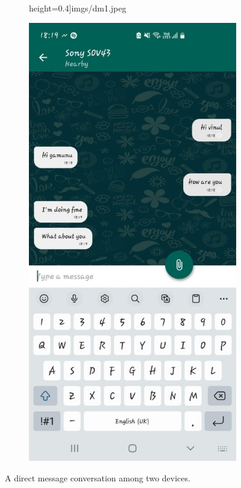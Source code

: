 \begin{figure}
\begin{subfigure}[b]{0.3\textwidth}
            height=0.4\textheight]{imgs/dm1.jpeg}
        \label{dm:1}
    \end{subfigure}
    \hspace{1cm}
    \begin{subfigure}[b]{0.3\textwidth}
        \includegraphics[width=\textwidth,
            height=0.4\textheight]{imgs/dm2.jpeg}
        \label{dm:2}
    \end{subfigure}
    \caption{A direct message conversation among two devices.}
    \label{dm}
\end{figure}

